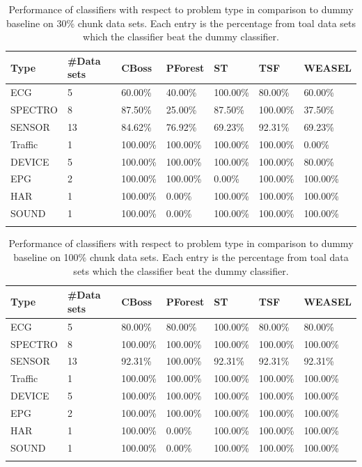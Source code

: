 \begin{table}[!htb]
	\setlength\extrarowheight{2pt} %
	\begin{tabularx}{\textwidth}{|X|X|X|X|X|X|X|}
	\hline
	\textbf{Type} & \textbf{\#Data sets} & \textbf{CBoss} & \textbf{PForest} & \textbf{ST} & \textbf{TSF} & \textbf{WEASEL} \\ \hline
		ECG & 5 & 60.00\% & 40.00\% & 100.00\% & 80.00\% & 60.00\% \\ \hline
		SPECTRO & 8 &87.50\% & 25.00\% & 87.50\% & 100.00\% & 37.50\% \\ \hline
		SENSOR & 13 & 84.62\% & 76.92\% & 69.23\% & 92.31\% & 69.23\% \\ \hline
		Traffic & 1 & 100.00\% & 100.00\% & 100.00\% & 100.00\% & 0.00\% \\ \hline
		DEVICE & 5 & 100.00\% & 100.00\% & 100.00\% & 100.00\% & 80.00\% \\ \hline
		EPG & 2 & 100.00\% & 100.00\% & 0.00\% & 100.00\% & 100.00\% \\ \hline
		HAR & 1 & 100.00\% & 0.00\% & 100.00\% & 100.00\% & 100.00\% \\ \hline
		SOUND & 1 & 100.00\% & 0.00\% & 100.00\% & 100.00\% & 100.00\% \\ \hline
  \caption{Performance of classifiers with respect to problem type in comparison to dummy baseline on 30\% chunk data sets. Each entry is the percentage from toal data sets which the classifier beat the dummy classifier.}
  \end{tabularx}
\end{table}

\begin{table}[!htb]
	\setlength\extrarowheight{2pt} %
	\begin{tabularx}{\textwidth}{|X|X|X|X|X|X|X|}
	\hline
	\textbf{Type} & \textbf{\#Data sets} & \textbf{CBoss} & \textbf{PForest} & \textbf{ST} & \textbf{TSF} & \textbf{WEASEL} \\ \hline
		ECG & 5 & 80.00\% & 80.00\% & 100.00\% & 80.00\% & 80.00\% \\ \hline
		SPECTRO & 8 &100.00\% & 100.00\% & 100.00\% & 100.00\% & 100.00\% \\ \hline
		SENSOR & 13 & 92.31\% & 100.00\% & 92.31\% & 92.31\% & 92.31\% \\ \hline
		Traffic & 1 & 100.00\% & 100.00\% & 100.00\% & 100.00\% & 100.00\% \\ \hline
		DEVICE & 5 & 100.00\% & 100.00\% & 100.00\% & 100.00\% & 100.00\% \\ \hline
		EPG & 2 & 100.00\% & 100.00\% & 100.00\% & 100.00\% & 100.00\% \\ \hline
		HAR & 1 & 100.00\% & 0.00\% & 100.00\% & 100.00\% & 100.00\% \\ \hline
		SOUND & 1 & 100.00\% & 0.00\% & 100.00\% & 100.00\% & 100.00\% \\ \hline
  \caption{Performance of classifiers with respect to problem type in comparison to dummy baseline on 100\% chunk data sets. Each entry is the percentage from toal data sets which the classifier beat the dummy classifier.}
  \end{tabularx}
\end{table}


